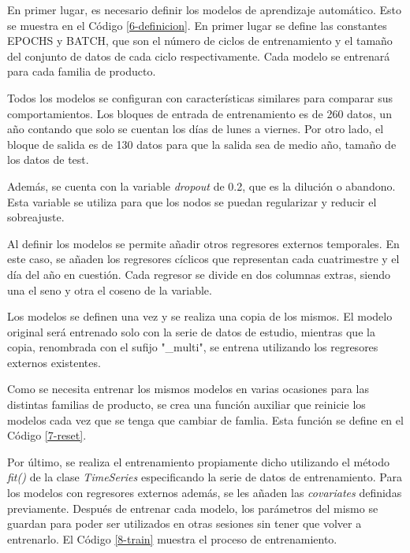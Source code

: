 En primer lugar, es necesario definir los modelos de aprendizaje automático. Esto se muestra en el Código \ref*{6-definicion}. En primer lugar se define las constantes EPOCHS y BATCH, que son el número de ciclos de entrenamiento y el tamaño del conjunto de datos de cada ciclo respectivamente. Cada modelo se entrenará para cada familia de producto.

Todos los modelos se configuran con características similares para comparar sus comportamientos. Los bloques de entrada de entrenamiento es de 260 datos, un año contando que solo se cuentan los días de lunes a viernes. Por otro lado, el bloque de salida es de 130 datos para que la salida sea de medio año, tamaño de los datos de test. 

Además, se cuenta con la variable \textit{dropout} de 0.2, que es la dilución o abandono. Esta variable se utiliza para que los nodos se puedan regularizar y reducir el sobreajuste.

Al definir los modelos se permite añadir otros regresores externos temporales. En este caso, se añaden los regresores cíclicos que representan cada cuatrimestre y el día del año en cuestión. Cada regresor se divide en dos columnas extras, siendo una el seno y otra el coseno de la variable. 

Los modelos se definen una vez y se realiza una copia de los mismos. El modelo original será entrenado solo con la serie de datos de estudio, mientras que la copia, renombrada con el sufijo "\_multi", se entrena utilizando los regresores externos existentes.



Como se necesita entrenar los mismos modelos en varias ocasiones para las distintas familias de producto, se crea una función auxiliar que reinicie los modelos cada vez que se tenga que cambiar de famlia. Esta función se define en el Código \ref*{7-reset}.



Por último, se realiza el entrenamiento propiamente dicho utilizando el método \textit{fit()} de la clase \textit{TimeSeries} especificando la serie de datos de entrenamiento. Para los modelos con regresores externos además, se les añaden las \textit{covariates} definidas previamente. Después de entrenar cada modelo, los parámetros del mismo se guardan para poder ser utilizados en otras sesiones sin tener que volver a entrenarlo. El Código \ref{8-train} muestra el proceso de entrenamiento. 


